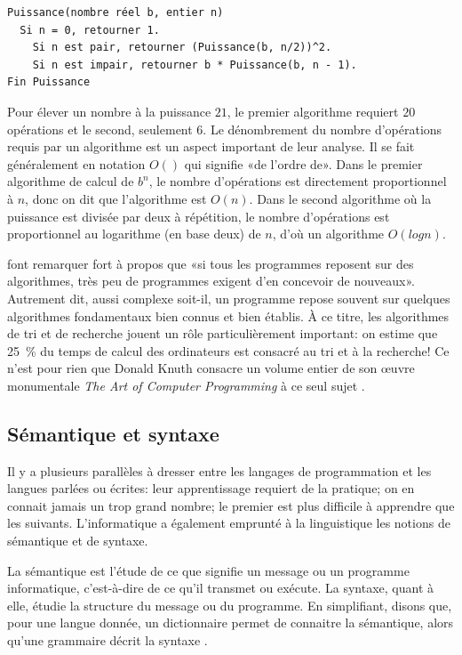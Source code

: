 \begin{Schunk}
\begin{Verbatim}
Puissance(nombre réel b, entier n)
  Si n = 0, retourner 1.
    Si n est pair, retourner (Puissance(b, n/2))^2.
    Si n est impair, retourner b * Puissance(b, n - 1).
Fin Puissance
\end{Verbatim}
\end{Schunk}

Pour élever un nombre à la puissance $21$, le premier algorithme
requiert $20$ opérations et le second, seulement $6$. Le dénombrement du
nombre d'opérations requis par un algorithme est un aspect important
de leur analyse. Il se fait généralement en notation $O()$ qui
signifie «de l'ordre de». Dans le premier algorithme de calcul de
$b^n$, le nombre d'opérations est directement proportionnel à $n$,
donc on dit que l'algorithme est $O(n)$. Dans le second algorithme où
la puissance est divisée par deux à répétition, le nombre d'opérations
est proportionnel au logarithme (en base deux) de $n$, d'où un
algorithme $O(log n)$.

\citet{Kernighan:practice:1999} font remarquer fort à propos que «si
tous les programmes reposent sur des algorithmes, très peu de
programmes exigent d'en concevoir de nouveaux». Autrement dit, aussi
complexe soit-il, un programme repose souvent sur quelques algorithmes
fondamentaux bien connus et bien établis. À ce titre, les algorithmes
de tri et de recherche jouent un rôle particulièrement important: on
estime que 25~\% du temps de calcul des ordinateurs est consacré au
tri et à la recherche! Ce n'est pour rien que Donald Knuth consacre un
volume entier de son œuvre monumentale \emph{The Art of Computer
  Programming} à ce seul sujet \citep{Knuth:ACP:vol1:1997}.


\subsection{Sémantique et syntaxe}
\label{sec:informatique:programmer:semantique}

Il y a plusieurs parallèles à dresser entre les langages de
programmation et les langues parlées ou écrites: leur apprentissage
requiert de la pratique; on en connait jamais un trop grand nombre; le
premier est plus difficile à apprendre que les suivants.
L'informatique a également emprunté à la linguistique les notions de
sémantique et de syntaxe.

La sémantique est l'étude de ce que signifie un message ou un
programme informatique, c'est-à-dire de ce qu'il transmet ou exécute.
La syntaxe, quant à elle, étudie la structure du message ou du
programme. En simplifiant, disons que, pour une langue donnée, un
dictionnaire permet de connaitre la sémantique, alors qu'une grammaire
décrit la syntaxe \citep{Hebenstreit:semantique}.

